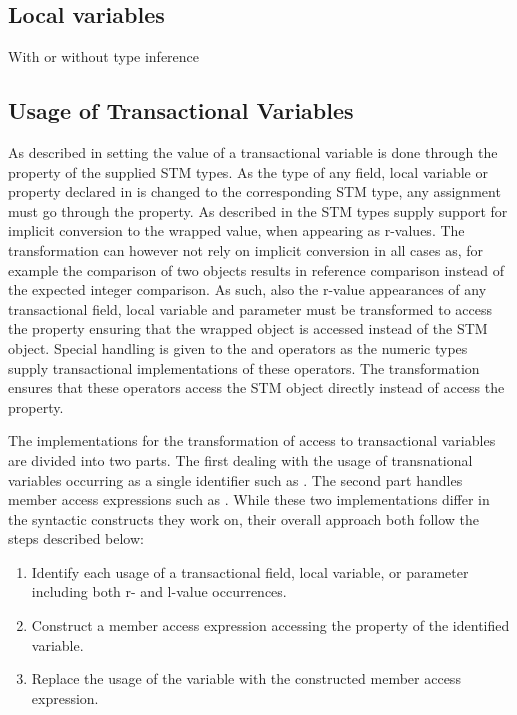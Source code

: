 
\subsection{Local variables}
With or without type inference

\subsection{Usage of Transactional Variables}
As described in  setting the value of a transactional variable is done through the  property of the supplied \ac{STM} types. As the type of any field, local variable or property declared  in \stmnamesp is changed to the corresponding \ac{STM} type, any assignment must go through the  property. As described in  the \ac{STM} types supply support for implicit conversion to the wrapped value, when appearing as r-values. The transformation can however not rely on implicit conversion in all cases as, for example the comparison of two  objects results in reference comparison instead of the expected integer comparison. As such, also the r-value appearances of any transactional field, local variable and parameter must be transformed to access the  property ensuring that the wrapped object is accessed instead of the \ac{STM} object. Special handling is given to the \bscode{++} and \bscode{--} operators as the numeric  types supply transactional implementations of these operators. The transformation ensures that these operators access the \ac{STM} object directly instead of access the  property.

The implementations for the transformation of access to transactional variables are divided into two parts. The first dealing with the usage of transnational variables occurring as a single identifier such as . The second part handles member access expressions such as . While these two implementations differ in the syntactic constructs they work on, their overall approach both follow the steps described below:

\begin{enumerate}
	\item Identify each usage of a transactional field, local variable, or parameter including both r- and l-value occurrences.
	\item Construct a member access expression accessing the  property of the identified variable.
	\item Replace the usage of the variable with the constructed member access expression. 
\end{enumerate}

